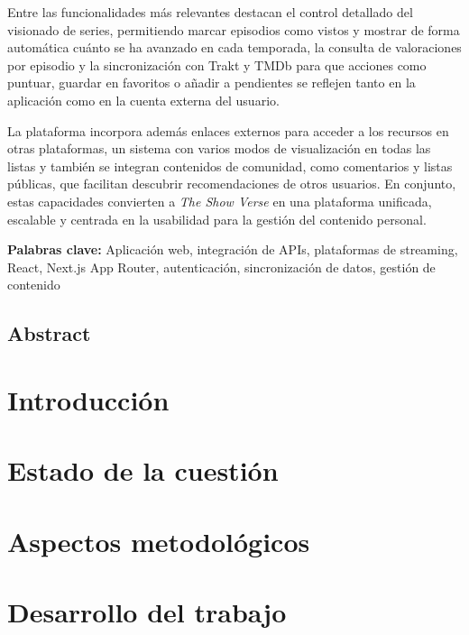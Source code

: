 \documentclass[oneside,a4paper,12pt]{book}
\begin{document}
Entre las funcionalidades más relevantes destacan el control detallado del visionado de series, permitiendo marcar episodios como vistos y mostrar de forma automática cuánto se ha avanzado en cada temporada, la consulta de valoraciones por episodio y la sincronización con Trakt y TMDb para que acciones como puntuar, guardar en favoritos o añadir a pendientes se reflejen tanto en la aplicación como en la cuenta externa del usuario.

La plataforma incorpora además enlaces externos para acceder a los recursos en otras plataformas, un sistema con varios modos de visualización en todas las listas y también se integran contenidos de comunidad, como comentarios y listas públicas, que facilitan descubrir recomendaciones de otros usuarios. En conjunto, estas capacidades convierten a \textit{The Show Verse} en una plataforma unificada, escalable y centrada en la usabilidad para la gestión del contenido personal.

\vspace{0.5cm}
\noindent\textbf{Palabras clave:} Aplicación web, integración de APIs, plataformas de streaming, React, Next.js App Router, autenticación, sincronización de datos, gestión de contenido

\vspace{1cm}
\section*{Abstract}



\newpage{\pagestyle{empty}}
\chapter{Introducción}  



\chapter{Estado de la cuestión}  



\chapter{Aspectos metodológicos}  



\chapter{Desarrollo del trabajo}  

\end{document}
